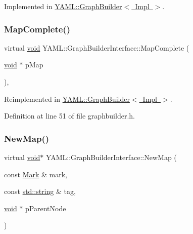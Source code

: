 Implemented in \mbox{\hyperlink{class_y_a_m_l_1_1_graph_builder_a5f92ce9e395edd4a3ab8e3e6d772b570}{Y\+A\+M\+L\+::\+Graph\+Builder$<$ Impl $>$}}.

\mbox{\label{class_y_a_m_l_1_1_graph_builder_interface_ae572063ef5c737705e2f75340b116766}} 
\subsubsection{\texorpdfstring{MapComplete()}{MapComplete()}}
{\footnotesize\ttfamily virtual \mbox{\hyperlink{glad_8h_a950fc91edb4504f62f1c577bf4727c29}{void}} Y\+A\+M\+L\+::\+Graph\+Builder\+Interface\+::\+Map\+Complete (\begin{DoxyParamCaption}\item[{\mbox{\hyperlink{glad_8h_a950fc91edb4504f62f1c577bf4727c29}{void}} $\ast$}]{p\+Map }\end{DoxyParamCaption})\hspace{0.3cm}{\ttfamily [inline]}, {\ttfamily [virtual]}}



Reimplemented in \mbox{\hyperlink{class_y_a_m_l_1_1_graph_builder_a351b27b50b691777d61412969b483a2d}{Y\+A\+M\+L\+::\+Graph\+Builder$<$ Impl $>$}}.



Definition at line 51 of file graphbuilder.\+h.

\mbox{\label{class_y_a_m_l_1_1_graph_builder_interface_ac90052647ba4db8536e3e457d7bb7489}} 
\subsubsection{\texorpdfstring{NewMap()}{NewMap()}}
{\footnotesize\ttfamily virtual \mbox{\hyperlink{glad_8h_a950fc91edb4504f62f1c577bf4727c29}{void}}$\ast$ Y\+A\+M\+L\+::\+Graph\+Builder\+Interface\+::\+New\+Map (\begin{DoxyParamCaption}\item[{const \mbox{\hyperlink{struct_y_a_m_l_1_1_mark}{Mark}} \&}]{mark,  }\item[{const \mbox{\hyperlink{glad_8h_ac83513893df92266f79a515488701770}{std\+::string}} \&}]{tag,  }\item[{\mbox{\hyperlink{glad_8h_a950fc91edb4504f62f1c577bf4727c29}{void}} $\ast$}]{p\+Parent\+Node }\end{DoxyParamCaption})\hspace{0.3cm}{\ttfamily [pure virtual]}}



